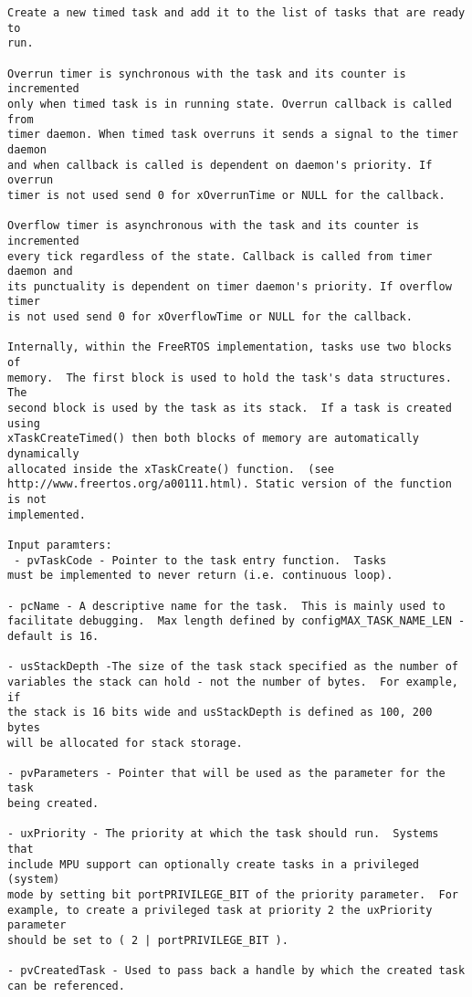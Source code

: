 \begin{lstlisting}        
Create a new timed task and add it to the list of tasks that are ready to
run.

Overrun timer is synchronous with the task and its counter is incremented
only when timed task is in running state. Overrun callback is called from
timer daemon. When timed task overruns it sends a signal to the timer daemon
and when callback is called is dependent on daemon's priority. If overrun
timer is not used send 0 for xOverrunTime or NULL for the callback.

Overflow timer is asynchronous with the task and its counter is incremented
every tick regardless of the state. Callback is called from timer daemon and
its punctuality is dependent on timer daemon's priority. If overflow timer
is not used send 0 for xOverflowTime or NULL for the callback.

Internally, within the FreeRTOS implementation, tasks use two blocks of
memory.  The first block is used to hold the task's data structures.  The
second block is used by the task as its stack.  If a task is created using
xTaskCreateTimed() then both blocks of memory are automatically dynamically
allocated inside the xTaskCreate() function.  (see
http://www.freertos.org/a00111.html). Static version of the function is not
implemented.

Input paramters:
 - pvTaskCode - Pointer to the task entry function.  Tasks
must be implemented to never return (i.e. continuous loop).

- pcName - A descriptive name for the task.  This is mainly used to
facilitate debugging.  Max length defined by configMAX_TASK_NAME_LEN - default is 16.

- usStackDepth -The size of the task stack specified as the number of
variables the stack can hold - not the number of bytes.  For example, if
the stack is 16 bits wide and usStackDepth is defined as 100, 200 bytes
will be allocated for stack storage.

- pvParameters - Pointer that will be used as the parameter for the task
being created.

- uxPriority - The priority at which the task should run.  Systems that
include MPU support can optionally create tasks in a privileged (system)
mode by setting bit portPRIVILEGE_BIT of the priority parameter.  For
example, to create a privileged task at priority 2 the uxPriority parameter
should be set to ( 2 | portPRIVILEGE_BIT ).

- pvCreatedTask - Used to pass back a handle by which the created task
can be referenced.


\end{lstlisting}
